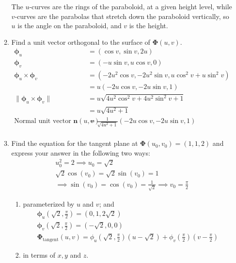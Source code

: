 \documentclass{article}
\newcommand{\norm}[1]{\| #1 \|}
\begin{document}
\begin{enumerate}
\begin{enumerate}
        The $u$-curves are the rings of the paraboloid, at a given height level, while $v$-curves are the parabolas that stretch down the paraboloid vertically, so $u$ is the angle on the paraboloid, and $v$ is the height.
        \item Find a unit vector orthogonal to the surface of $\boldsymbol \Phi (u,v)$.
        \begin{align*}
            \boldsymbol \phi_u &= (\cos v, \sin v, 2u) \\
            \boldsymbol \phi_v &= (-u \sin v, u \cos v, 0) \\
            \boldsymbol \phi_u \times \boldsymbol \phi_v &= (-2u^2 \cos v, -2u^2 \sin v, u \cos^2 v + u \sin^2 v) \\
            &= u(-2u\cos v, -2u\sin v , 1) \\
            \norm{\boldsymbol \phi_u \times \boldsymbol \phi_v} &= u\sqrt{4u^2 \cos^2 v + 4u^2 \sin^2 v + 1} \\
            &= u\sqrt{4u^2 + 1} \\
            \text{Normal unit vector } \boldsymbol n(u,v) &= \frac{1}{\sqrt{4u^2 +1}}(-2u \cos v, -2u\sin v , 1) \\
        \end{align*}
        \item Find the equation for the tangent plane at $\boldsymbol \Phi(u_0,v_0) = (1,1,2)$ and express your answer in the following two ways:
        \begin{align*}
            u_0^2 = 2 \implies u_0 = \sqrt{2} \\
            \sqrt{2} \cos (v_0) = \sqrt{2} \sin (v_0) = 1 \\ 
            \implies \sin(v_0) = \cos(v_0) = \frac{1}{\sqrt{2}} \implies v_0 = \frac{\pi}{2}
        \end{align*} 
        \begin{enumerate}
            \item parameterized by $u$ and $v$; and
                \begin{align*}
                    \boldsymbol \phi_u(\sqrt2 , \frac{\pi}{2}) = (0, 1, 2\sqrt{2}) \\
                    \boldsymbol \phi_v(\sqrt2 , \frac{\pi}{2}) = (-\sqrt{2}, 0, 0) \\
                    \boldsymbol \Phi_{\text{tangent}} (u,v) = \phi_u(\sqrt2 , \frac{\pi}{2})(u - \sqrt2) + \phi_v(\frac{\pi}{2})(v - \frac{\pi}{2})
                \end{align*}
            \item in terms of $x,y$ and $z$.
        \end{enumerate}


\end{enumerate}
\end{enumerate}
\end{document}
